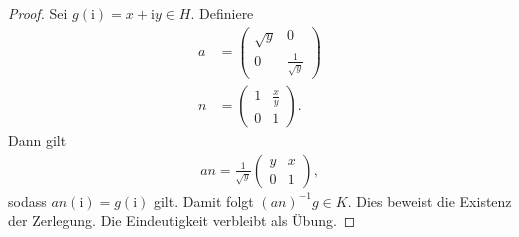 \begin{proof}
Sei $g(\mathrm{i})=x+\mathrm{i}y\in H$.
Definiere
\begin{align*}
a&=\begin{pmatrix}
\sqrt{y}&0\\
0&\frac{1}{\sqrt{y}}
\end{pmatrix}\\
n&=\begin{pmatrix}
1&\frac{x}{y}\\
0&1
\end{pmatrix}.
\end{align*}
Dann gilt
\begin{align*}
an=\frac{1}{\sqrt{y}} \begin{pmatrix}
y&x\\
0&1
\end{pmatrix},
\end{align*}
sodass $an(\mathrm{i})=g(\mathrm{i})$ gilt.
Damit folgt $(an)^{-1} g \in K$.
Dies beweist die Existenz der Zerlegung.
Die Eindeutigkeit verbleibt als Übung.
\end{proof}

